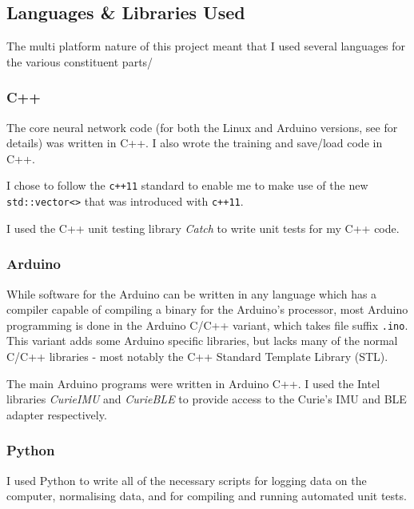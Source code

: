 \documentclass[a4paper]{article}
\begin{document}
\subsection{Languages \& Libraries Used}%

The multi platform nature of this project meant that I used several languages for the various constituent parts/

\subsubsection{C++}

The core neural network code (for both the Linux and Arduino versions, see  for details) was written in C++\cite{ppref4}. I also wrote the training and save/load code in C++.

I chose to follow the \lstinline{c++11}\cite{ppref5} standard to enable me to make use of the new \lstinline{std::vector<>} that was introduced with \lstinline{c++11}.

I used the C++ unit testing library \textit{Catch}\cite{ppref6} to write unit tests for my C++ code.

\subsubsection{Arduino}

While software for the Arduino can be written in any language which has a compiler capable of compiling a binary for the Arduino's processor, most Arduino programming is done in the Arduino C/C++ variant\cite{ppref7}, which takes file suffix \lstinline{.ino}. This variant adds some Arduino specific libraries\cite{ppref8}, but lacks many of the normal C/C++ libraries - most notably the C++ Standard Template Library (STL).\cite{ppref9}

The main Arduino programs were written in Arduino C++. I used the Intel libraries \textit{CurieIMU}\cite{ppref10} and \textit{CurieBLE}\cite{ppref11} to provide access to the Curie's IMU and BLE adapter respectively.

\subsubsection{Python}

I used Python\cite{ppref12} to write all of the necessary scripts for logging data on the computer, normalising data, and for compiling and running automated unit tests.
\end{document}
